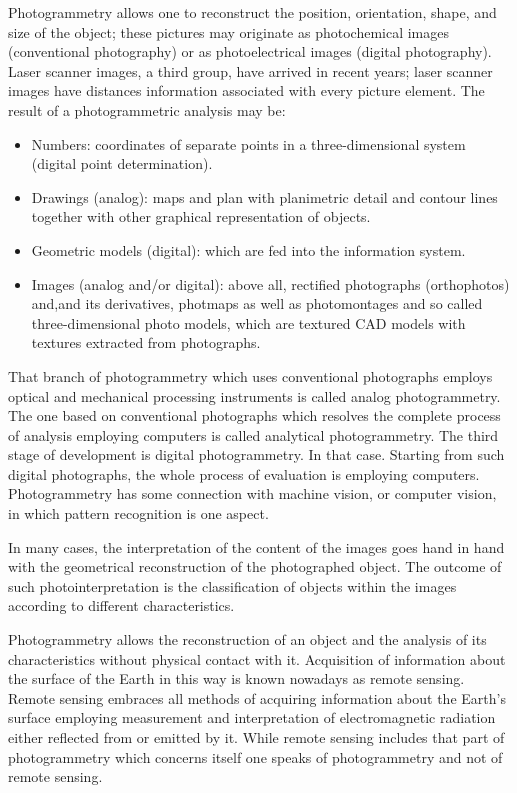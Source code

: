 Photogrammetry allows one to reconstruct the position, orientation, shape, and size of the object; these pictures may originate as photochemical images (conventional photography) or as photoelectrical images (digital photography). Laser scanner images, a third group, have arrived in recent years; laser scanner images have distances information associated with every picture element. The result of a photogrammetric analysis may be:\cite{Kraus}
\begin{itemize}
    \item Numbers: coordinates of separate points in a three-dimensional system (digital point determination).
    \item Drawings (analog):  maps and plan with planimetric detail and contour lines together with other graphical representation of objects.
    \item Geometric models (digital): which are fed into the information system.
    \item Images (analog and/or digital): above all, rectified photographs (orthophotos) and,and its derivatives, photmaps  as well as photomontages and so called three-dimensional photo models, which are textured CAD models with textures extracted from photographs.
\end{itemize}
That branch of photogrammetry which uses conventional photographs employs optical and mechanical processing instruments is called analog photogrammetry. The one based on conventional photographs which resolves the complete process of analysis employing computers is called analytical photogrammetry. The third stage of development is digital photogrammetry. In that case. Starting from such digital photographs, the whole process of evaluation is employing computers. Photogrammetry has some connection with machine vision, or computer vision, in which pattern recognition is one aspect.\cite{Kraus} 

In many cases, the interpretation of the content of the images goes hand in hand with the geometrical reconstruction of the photographed object. The outcome of such photointerpretation is the classification of objects within the images according to different characteristics.\cite{Kraus}

Photogrammetry allows the reconstruction of an object and the analysis of its characteristics without physical contact with it. Acquisition of information about the surface of the Earth in this way is known nowadays as remote sensing. Remote sensing embraces all methods of acquiring information about the Earth's surface employing measurement and interpretation of electromagnetic radiation either reflected from or emitted by it. While remote sensing includes that part of photogrammetry which concerns itself one speaks of photogrammetry and not of remote sensing. \cite{Kraus}

